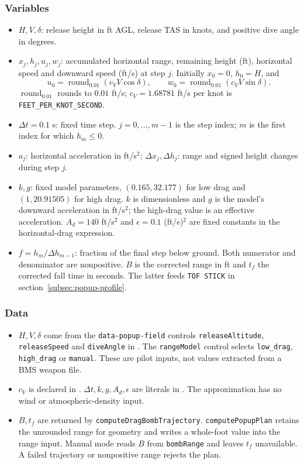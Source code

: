 \documentclass[10pt,a4paper]{amsart}
\DeclareMathOperator{\rnd}{round}
\begin{document}
\subsubsection*{Variables}
\begin{itemize}
\setlength{\itemsep}{0pt}
\setlength{\parsep}{0pt}
\item $H,V,\delta$: release height in ft AGL, release TAS in knots,
and positive dive angle in degrees.
\item $x_j,h_j,u_j,w_j$: accumulated horizontal range, remaining
height (ft), horizontal speed and downward speed (ft/s) at step $j$.
Initially $x_0=0$, $h_0=H$, and
\[
 u_0=\rnd_{0.01}(c_VV\cos\delta),\qquad
 w_0=\rnd_{0.01}(c_VV\sin\delta).
\]
$\rnd_{0.01}$ rounds to $0.01$ ft/s;
$c_V=1.68781$ ft/s per knot is \texttt{FEET\_PER\_KNOT\_SECOND}.
\item $\Delta t=0.1$ s: fixed time step. $j=0,\ldots,m-1$ is the
step index; $m$ is the first index for which $h_m\leq0$.
\item $a_j$: horizontal acceleration in ft/s$^2$;
$\Delta x_j,\Delta h_j$: range and signed height changes during step $j$.
\item $k,g$: fixed model parameters, $(0.165,32.177)$ for low drag
and $(1,20.91505)$ for high drag. $k$ is dimensionless and $g$ is
the model's downward acceleration in ft/s$^2$; the high-drag value
is an effective acceleration.
$A_d=140$ ft/s$^2$ and $\epsilon=0.1$ (ft/s)$^2$ are fixed constants
in the horizontal-drag expression.
\item $f=h_m/\Delta h_{m-1}$: fraction of the final step below
ground. Both numerator and denominator are nonpositive.
$B$ is the corrected range in ft and $t_f$ the corrected fall time
in seconds. The latter feeds \texttt{TOF STICK} in
section~\ref{subsec:popup-profile}.
\end{itemize}

\subsubsection*{Data}
\begin{itemize}
\setlength{\itemsep}{0pt}
\setlength{\parsep}{0pt}
\item $H,V,\delta$ come from the \texttt{data-popup-field} controls
\texttt{releaseAltitude}, \texttt{releaseSpeed} and \texttt{diveAngle}
in . The \texttt{rangeModel} control selects
\texttt{low\_drag}, \texttt{high\_drag} or \texttt{manual}.
These are pilot inputs, not values extracted from a BMS weapon file.
\item $c_V$ is declared in .
$\Delta t,k,g,A_d,\epsilon$ are literals in
.
The approximation has no wind or atmospheric-density input.
\item $B,t_f$ are returned by \texttt{computeDragBombTrajectory}.
\texttt{computePopupPlan} retains the unrounded range for geometry
and writes a whole-foot value into the range input.
Manual mode reads $B$ from \texttt{bombRange} and leaves $t_f$
unavailable. A failed trajectory or nonpositive range rejects the plan.
\end{itemize}
\end{document}
